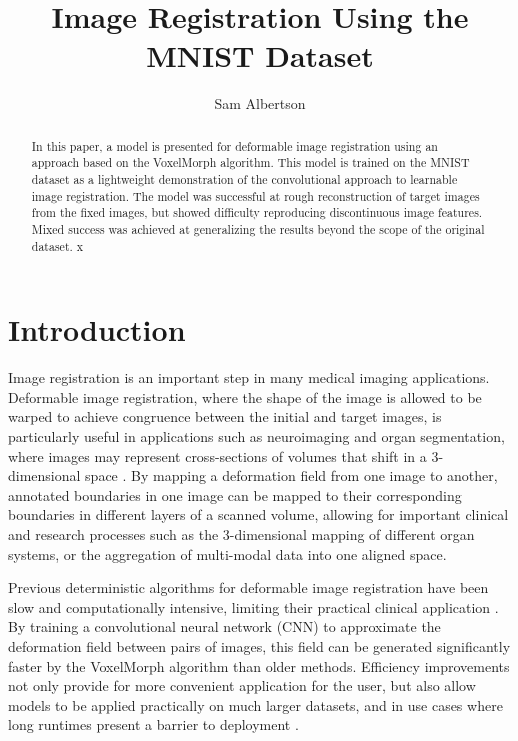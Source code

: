\documentclass{article} %
\title{Image Registration Using the MNIST Dataset}
\author{Sam Albertson}
\begin{document}
\maketitle

\begin{abstract}
In this paper, a model is presented for deformable image registration using an approach based on the VoxelMorph algorithm. This model is trained on the MNIST dataset as a lightweight demonstration of the convolutional approach to learnable image registration. The model was successful at rough reconstruction of target images from the fixed images, but showed difficulty reproducing discontinuous image features. Mixed success was achieved at generalizing the results beyond the scope of the original dataset. x

\end{abstract}

\section{Introduction}
Image registration is an important step in many medical imaging applications. Deformable image registration, where the shape of the image is allowed to be warped to achieve congruence between the initial and target images, is particularly useful in applications such as neuroimaging and organ segmentation, where images may represent cross-sections of volumes that shift in a 3-dimensional space \cite{sheikhjafari_unsupervised_2022}. By mapping a deformation field from one image to another, annotated boundaries in one image can be mapped to their corresponding boundaries in different layers of a scanned volume, allowing for important clinical and research processes such as the 3-dimensional mapping of different organ systems, or the aggregation of multi-modal data into one aligned space.

Previous deterministic algorithms for deformable image registration have been slow and computationally intensive, limiting their practical clinical application \cite{balakrishnan_voxelmorph_2019}. By training a convolutional neural network (CNN) to approximate the deformation field between pairs of images, this field can be generated significantly faster by the VoxelMorph algorithm than older methods. Efficiency improvements not only provide for more convenient application for the user, but also allow models to be applied practically on much larger datasets, and in use cases where long runtimes present a barrier to deployment \cite{manolis_kellis_deep_2021}. 
\end{document}
